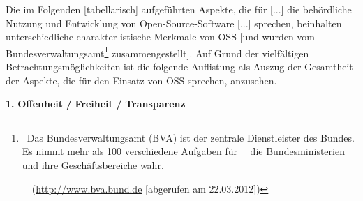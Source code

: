 \documentclass[a4paper]{article}
\newcommand\textstyleInternetlink[1]{\foreignlanguage{english}{\textcolor[rgb]{0.0,0.0,0.5019608}{#1}}}
\newcommand\textstyleACRONYM[1]{#1}
\begin{document}


\bigskip


\bigskip

{
{\guillemotright}Die im Folgenden [tabellarisch] aufgef\"uhrten Aspekte,
die f\"ur [...] die beh\"ordliche Nutzung und Entwicklung von
Open-Source-Software [...] sprechen, beinhalten unterschiedliche
charakter-istische Merkmale von
\textstyleACRONYM{OSS}\textstyleACRONYM{
}\textstyleACRONYM{[und}\textstyleACRONYM{
}\textstyleACRONYM{wurden}\textstyleACRONYM{
}\textstyleACRONYM{vom}\textstyleACRONYM{
}\textstyleACRONYM{Bundesverwaltungsamt}\footnote{\ {\guillemotright}Das
Bundesverwaltungsamt (BVA) ist der zentrale Dienstleister des Bundes.
Es nimmt mehr als 100 verschiedene Aufgaben f\"ur \ \ die
Bundesministerien und ihre Gesch\"aftsbereiche wahr.
{\guillemotleft}\par
\ \ (\href{http://www.bva.bund.de/}{\textstyleInternetlink{http://www.bva.bund.de}}
[abgerufen am 22.03.2012])}\textstyleACRONYM{
}\textstyleACRONYM{zusammengestellt]}. Auf Grund der vielf\"altigen
Betrachtungsm\"oglichkeiten ist die folgende Auflistung als Auszug der
Gesamtheit der Aspekte, die f\"ur den Einsatz von
\textstyleACRONYM{OSS} sprechen, anzusehen.}


\bigskip


\bigskip


\bigskip

{
\textbf{1.}\textbf{ }\textbf{Offenheit}\textbf{ }\textbf{/}\textbf{
}\textbf{Freiheit}\textbf{ }\textbf{/}\textbf{ }\textbf{Transparenz}}


\bigskip
\end{document}
